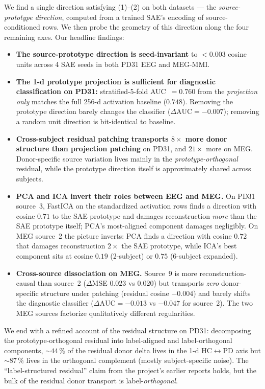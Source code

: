 \documentclass[11pt]{article}
\begin{document}
We find a single direction satisfying (1)--(2) on both datasets --- the
\emph{source-prototype direction}, computed from a trained SAE's encoding of
source-conditioned rows. We then probe the geometry of this direction along the
four remaining axes. Our headline findings:
\begin{itemize}
\item \textbf{The source-prototype direction is seed-invariant} to
$<\!0.003$ cosine units across 4 SAE seeds in both PD31 EEG and MEG-MMI.
\item \textbf{The 1-d prototype projection is sufficient for diagnostic
classification on PD31:} stratified-5-fold AUC~$=0.760$ from the
\emph{projection only} matches the full 256-d activation baseline ($0.748$).
Removing the prototype direction barely changes the classifier
($\Delta\text{AUC}=-0.007$); removing a random unit direction is
bit-identical to baseline.
\item \textbf{Cross-subject residual patching transports $8\times$ more donor
structure than projection patching} on PD31, and $21\times$ more on MEG.
Donor-specific source variation lives mainly in the \emph{prototype-orthogonal}
residual, while the prototype direction itself is approximately shared across
subjects.
\item \textbf{PCA and ICA invert their roles between EEG and MEG.} On PD31
source~3, FastICA on the standardized activation rows finds a direction with
cosine $0.71$ to the SAE prototype and damages reconstruction \emph{more} than
the SAE prototype itself; PCA's most-aligned component damages negligibly.
On MEG source~2 the picture inverts: PCA finds a direction with cosine $0.72$
that damages reconstruction $2\times$ the SAE prototype, while ICA's best
component sits at cosine $0.19$ (2-subject) or $0.75$ (6-subject expanded).
\item \textbf{Cross-source dissociation on MEG.} Source~9 is more
reconstruction-causal than source~2 ($\Delta$MSE $0.023$ vs $0.020$) but
transports \emph{zero} donor-specific structure under patching (residual
cosine $-0.004$) and barely shifts the diagnostic classifier
($\Delta\text{AUC}=-0.013$ vs $-0.047$ for source~2). The two MEG sources
factorize qualitatively different regularities.
\end{itemize}

We end with a refined account of the residual structure on PD31: decomposing the
prototype-orthogonal residual into label-aligned and label-orthogonal components,
$\sim 44\,\%$ of the residual donor delta lives in the 1-d HC$\leftrightarrow$PD
axis but $\sim 87\,\%$ lives in the orthogonal complement (mostly
subject-specific noise). The ``label-structured residual'' claim from the
project's earlier reports holds, but the bulk of the residual donor transport is
label-\emph{orthogonal}.
\end{document}
